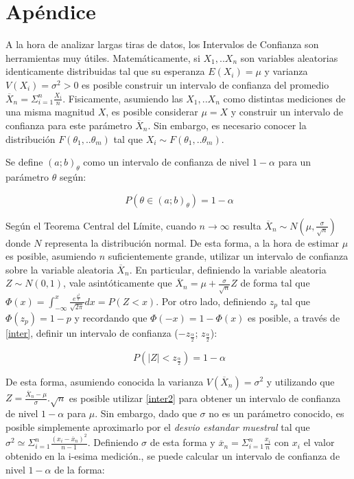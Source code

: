 \documentclass[11pt,a4paper]{article}
\begin{document}
\section{Apéndice}
\label{sec:apendice}

A la hora de analizar largas tiras de datos, los Intervalos de Confianza son herramientas muy útiles. Matemáticamente, si $X_1,..X_n$ son variables aleatorias identicamente distribuidas tal que su esperanza $E(X_i) = \mu$ y varianza $V(X_i) = \sigma^2 > 0$ es posible construir un intervalo de confianza del promedio $\overline{X}_n = \Sigma_{i=1}^{n} \frac{X_i}{n}$. Fisicamente, asumiendo las $X_1,..X_n$ como distintas mediciones de una misma magnitud $X$, es posible considerar $\mu = X$ y construir un intervalo de confianza para este parámetro $\overline{X}_n$. Sin embargo, es necesario conocer la distribución $F(\theta_1,..\theta_m)$ tal que $X_i \sim F(\theta_1,..\theta_m)$. 

Se define $(a;b)_{\theta}$ como un intervalo de confianza de nivel $1-\alpha$ para un parámetro $\theta$ según:

\begin{equation}\label{inter}
\ P(\theta\in(a;b)_{\theta})= 1-\alpha
\end{equation}

Según el Teorema Central del Límite, cuando $n\rightarrow\infty$ resulta $\overline{X}_n \sim N(\mu, \frac{\sigma}{\sqrt{n}})$ donde $N$ representa la distribución normal. De esta forma, a la hora de estimar $\mu$ es posible, asumiendo $n$ suficientemente grande, utilizar un intervalo de confianza sobre la variable aleatoria $\overline{X}_n$. En particular, definiendo la variable aleatoria $Z \sim N(0,1)$, vale asintóticamente que $\overline{X}_n = \mu + \frac{\sigma}{\sqrt{n}}Z$ de forma tal que $\Phi(x) = \int_{-\infty}^x \frac{e^{\frac{x^2}{2}}}{\sqrt{2\pi}} dx = P(Z<x)$. Por otro lado, definiendo $z_{p}$ tal que $\Phi(z_{p}) = 1-p$ y recordando que $\Phi(-x) = 1-\Phi(x)$ es posible, a través de \eqref{inter}, definir un intervalo de confianza ($-z_{\frac{\alpha}{2}}$; $z_{\frac{\alpha}{2}}$):

\begin{equation}\label{inter2}
\ P(|Z|<z_{\frac{\alpha}{2}})= 1-\alpha
\end{equation}

De esta forma, asumiendo conocida la varianza $V(\overline{X}_n) = \sigma^2$ y utilizando que $Z = \frac{\overline{X}_n-\mu}{\sigma}.\sqrt{n}$ es posible utilizar \eqref{inter2} para obtener un intervalo de confianza de nivel $1-\alpha$ para $\mu$. Sin embargo, dado que $\sigma$ no es un parámetro conocido, es posible simplemente aproximarlo por el \textit{desvio estandar muestral} tal que $\sigma^2 \simeq \Sigma_{i=1}^{n}\frac{(x_i-\overline{x}_n)^2}{n-1}$. Definiendo $\sigma$ de esta forma y $\overline{x}_n = \Sigma_{i=1}^{n} \frac{x_i}{n}$ con $x_i$ el valor obtenido en la i-esima medición., se puede calcular un intervalo de confianza de nivel $1-\alpha$ de la forma:
\end{document}
